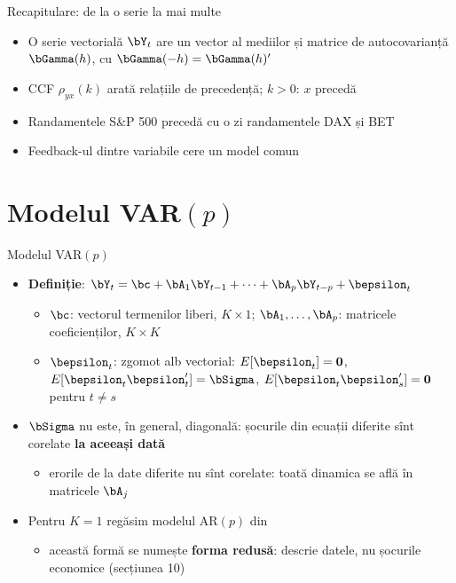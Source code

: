 \begin{frame}{Recapitulare: de la o serie la mai multe}
\itemsize{\small}
\begin{itemize}
    \item O serie vectorială $\bY_t$ are un vector al mediilor și matrice de autocovarianță $\bGamma(h)$, cu $\bGamma(-h) = \bGamma(h)'$
    \item CCF $\rho_{yx}(k)$ arată relațiile de precedență; $k > 0$: $x$ precedă
    \item Randamentele S\&P 500 precedă cu o zi randamentele DAX și BET
    \item Feedback-ul dintre variabile cere un model comun
\end{itemize}
\end{frame}


\section{Modelul VAR$(p)$}

\begin{frame}{Modelul VAR$(p)$}
\itemsize{\small}
\begin{itemize}
    \item \textbf{Definiție}: $\bY_t = \bc + \bA_1\bY_{t-1} + \dots + \bA_p\bY_{t-p} + \bepsilon_t$
    \begin{itemize}
        \item $\bc$: vectorul termenilor liberi, $K \times 1$; $\bA_1, \dots, \bA_p$: matricele coeficienților, $K \times K$
        \item $\bepsilon_t$: zgomot alb vectorial: $E[\bepsilon_t] = \mathbf{0}$, $E[\bepsilon_t\bepsilon_t'] = \bSigma$, $E[\bepsilon_t\bepsilon_s'] = \mathbf{0}$ pentru $t \ne s$
    \end{itemize}
    \item $\bSigma$ nu este, în general, diagonală: șocurile din ecuații diferite sînt corelate \textbf{la aceeași dată}
    \begin{itemize}
        \item erorile de la date diferite nu sînt corelate: toată dinamica se află în matricele $\bA_j$
    \end{itemize}
    \item Pentru $K = 1$ regăsim modelul AR$(p)$ din 
    \begin{itemize}
        \item această formă se numește \textbf{forma redusă}: descrie datele, nu șocurile economice (secțiunea 10)
    \end{itemize}
\end{itemize}
\end{frame}

